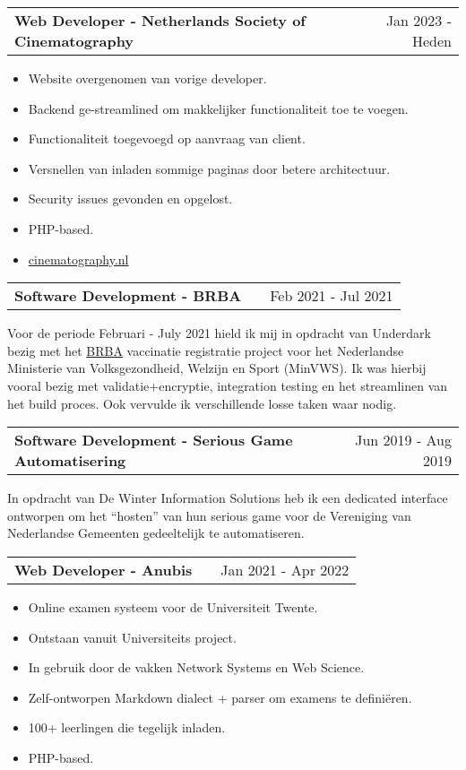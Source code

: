 \documentclass[a4paper,12pt]{article}
\makeatletter
\newenvironment{jobshort}[2]
    {
    \begin{tabularx}{\linewidth}{@{}l X r@{}}
    \textbf{#1} & \hfill &  #2 \\[3.75pt]
    \end{tabularx}
    }
    {
    }
\newenvironment{joblong}[2]
    {
    \begin{tabularx}{\linewidth}{@{}l X r@{}}
    \textbf{#1} & \hfill &  #2 \\[3.75pt]
    \end{tabularx}
    \begin{minipage}[t]{\linewidth}
    \begin{itemize}[nosep,after=\strut, leftmargin=1em, itemsep=3pt,label=--]
    }
    {
    \end{itemize}
    \end{minipage}    
    }
\makeatother
\begin{document}
\begin{joblong}{Web Developer - Netherlands Society of Cinematography}{Jan 2023 - Heden}
\item Website overgenomen van vorige developer.
\item Backend ge-streamlined om makkelijker functionaliteit toe te voegen.
\item Functionaliteit toegevoegd op aanvraag van client.
\item Versnellen van inladen sommige paginas door betere architectuur.
\item Security issues gevonden en opgelost.
\item PHP-based.
\item \href{https://cinematography.nl}{cinematography.nl}
\end{joblong}

\begin{jobshort}{Software Development - BRBA}{Feb 2021 - Jul 2021}
Voor de periode Februari - July 2021 hield ik mij in opdracht van Underdark bezig met het \href{https://www.ronroozendaal.nl/blog/2021/05/een-nieuw-registratiesysteem-in-een-paar-weken-tijd}{BRBA} vaccinatie registratie project voor het Nederlandse Ministerie van
Volksgezondheid, Welzijn en Sport (MinVWS). Ik was hierbij vooral bezig met validatie+encryptie, integration testing en het streamlinen van het build proces. Ook vervulde ik verschillende losse taken waar nodig.
\end{jobshort}

\begin{jobshort}{Software Development - Serious Game Automatisering}{Jun 2019 - Aug 2019}
In opdracht van De Winter Information Solutions heb ik een dedicated interface ontworpen om het ``hosten'' van hun serious game voor de Vereniging van Nederlandse Gemeenten gedeeltelijk te automatiseren. 
\end{jobshort}

\begin{joblong}{Web Developer - Anubis}{Jan 2021 - Apr 2022}
\item Online examen systeem voor de Universiteit Twente.
\item Ontstaan vanuit Universiteits project.
\item In gebruik door de vakken Network Systems en Web Science.
\item Zelf-ontworpen Markdown dialect + parser om examens te definiëren. 
\item 100+ leerlingen die tegelijk inladen.
\item PHP-based.
\end{joblong}
  
\end{document}

